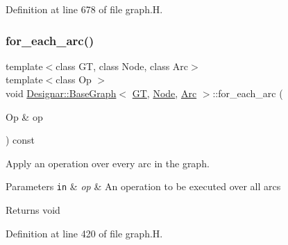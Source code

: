 Definition at line 678 of file graph.\+H.

\mbox{\label{class_designar_1_1_base_graph_ac46a1a7517a6c7029c6bae23d480cfa9}} 
\subsubsection{\texorpdfstring{for\+\_\+each\+\_\+arc()}{for\_each\_arc()}\hspace{0.1cm}{\footnotesize\ttfamily [1/2]}}
{\footnotesize\ttfamily template$<$class GT, class Node, class Arc$>$ \\
template$<$class Op $>$ \\
void \hyperlink{class_designar_1_1_base_graph}{Designar\+::\+Base\+Graph}$<$ \hyperlink{demo-buildgraph_8_c_a3001c40d2c31ca87ed96cd7d1334a55e}{GT}, \hyperlink{namespace_designar_a5af326c65aa2bd26b26c410f2030d09e}{Node}, \hyperlink{namespace_designar_a3f55fb5513d62ff47cbc8f72b8e95d6f}{Arc} $>$\+::for\+\_\+each\+\_\+arc (\begin{DoxyParamCaption}\item[{Op \&}]{op }\end{DoxyParamCaption}) const\hspace{0.3cm}{\ttfamily [inline]}}



Apply an operation over every arc in the graph. 


\begin{DoxyParams}[1]{Parameters}
\mbox{\tt in}  & {\em op} & An operation to be executed over all arcs \\
\hline
\end{DoxyParams}
\begin{DoxyReturn}{Returns}
void 
\end{DoxyReturn}


Definition at line 420 of file graph.\+H.

\mbox{\label{class_designar_1_1_base_graph_ae76905d5baebd62d0fc481efc7c20f66}} 
